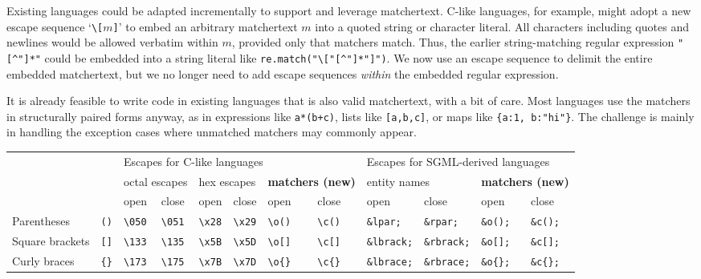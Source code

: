Existing languages could be adapted incrementally
to support and leverage matchertext.
C-like languages, for example,
might adopt a new escape sequence `\verb|\[|$m$\verb|]|'
to embed an arbitrary matchertext $m$
into a quoted string or character literal.
All characters including quotes and newlines
would be allowed verbatim within $m$,
provided only that matchers match.
Thus,
the earlier string-matching regular expression
\verb|"[^"]*"|
could be embedded into a string literal
like \verb|re.match("\["[^"]*"]")|.
We now use an escape sequence
to delimit the entire embedded matchertext,
but we no longer need to add escape sequences
\emph{within} the embedded regular expression.

It is already feasible to write code in existing languages
that is also valid matchertext,
with a bit of care.
Most languages use the matchers in structurally paired forms anyway,
as in expressions like \verb|a*(b+c)|,
lists like \verb|[a,b,c]|,
or maps like \verb|{a:1, b:"hi"}|.
The challenge is mainly in handling the exception cases
where unmatched matchers may commonly appear.

\begin{table*}
\begin{center}
\begin{footnotesize}
\begin{tabular}{ll||ll|ll|ll||ll|ll}
&		& \multicolumn{6}{|l||}{Escapes for C-like languages}
		& \multicolumn{4}{|l}{Escapes for SGML-derived languages} \\
&		& \multicolumn{2}{|l|}{octal escapes}
		& \multicolumn{2}{|l|}{hex escapes}
		& \multicolumn{2}{|l||}{\bf matchers (new)}
		& \multicolumn{2}{|l|}{entity names}
		& \multicolumn{2}{|l}{\bf matchers (new)}		\\
		&
		& open			& close
		& open			& close
		& open			& close
		& open			& close
		& open			& close		\\
\hline
Parentheses	& \verb|()|
		& \verb|\050|		& \verb|\051|
		& \verb|\x28|		& \verb|\x29|
		& \verb|\o()|		& \verb|\c()|
		& \verb|&lpar;|		& \verb|&rpar;|
		& \verb|&o();|		& \verb|&c();|	\\
Square brackets	& \verb|[]|
		& \verb|\133|		& \verb|\135|
		& \verb|\x5B|		& \verb|\x5D|
		& \verb|\o[]|		& \verb|\c[]|
		& \verb|&lbrack;|	& \verb|&rbrack;|
		& \verb|&o[];|		& \verb|&c[];|	\\
		
Curly braces	& \verb|{}|
		& \verb|\173|		& \verb|\175|
		& \verb|\x7B|		& \verb|\x7D|
		& \verb|\o{}|		& \verb|\c{}|
		& \verb|&lbrace;|	& \verb|&rbrace;|
		& \verb|&o{};|		& \verb|&c{};|	\\

\end{tabular}
\end{footnotesize}
\end{center}
\label{tab:unmatched-matchers}
\caption{Potential alternatives in C- and SGML-derived languages
	to escape unmatched matchers in matchertext.}
\end{table*}

